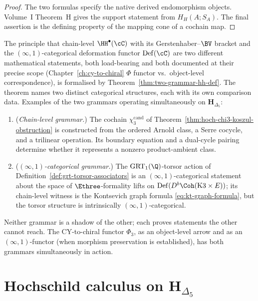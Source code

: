 \begin{proof}
The two formulas specify the native derived endomorphism objects.
Volume~I Theorem~H gives the support statement from $H_H(A;S_A)$.
The final assertion is the defining property of the mapping cone of a
cochain map.
\end{proof}

\begin{remark}
\label{rem:phi-functor-object-level-scope}
The principle that chain-level $\HH^\bullet(\cC)$ with its
Gerstenhaber--$\BV$ bracket and the $(\infty,1)$-categorical
deformation functor $\mathrm{Def}(\cC)$ are two different mathematical
statements, both load-bearing and both documented at their precise
scope (Chapter~\ref{ch:cy-to-chiral} $\Phi$ functor vs.\ object-level
correspondence), is formalised by Theorem~\ref{thm:two-grammar-hh-def}.
The theorem names two distinct categorical structures, each with its
own comparison data. Examples of the two grammars operating simultaneously on
$\mathbf H_{\Delta_5}$:
\begin{enumerate}[label=(\alph*),leftmargin=1.5em]
 \item (\emph{Chain-level grammar.}) The cochain
 $\chi_3^{\mathrm{cand}}$ of
 Theorem~\ref{thm:hoch-chi3-koszul-obstruction} is constructed from
 the ordered Arnold class, a Serre cocycle, and a trilinear operation.
 Its boundary equation and a dual-cycle pairing determine whether it
 represents a nonzero product-ambient class.
 \item (\emph{$(\infty,1)$-categorical grammar.}) The
 $\mathrm{GRT}_1(\Q)$-torsor action of
 Definition~\ref{def:grt-torsor-associators} is an
 $(\infty,1)$-categorical statement about the space of
 $\Ethree$-formality lifts on $\mathrm{Def}(D^b\Coh(\mathrm K3\times E))$;
 its chain-level witness is the Kontsevich graph formula
 \eqref{eq:kt-graph-formula}, but the torsor structure is intrinsically
 $(\infty,1)$-categorical.
\end{enumerate}
Neither grammar is a shadow of the other; each proves statements the
other cannot reach. The CY-to-chiral functor $\Phi_3$, as an
object-level arrow and as an $(\infty,1)$-functor (when morphism
preservation is established), has both grammars simultaneously in
action.
\end{remark}


\section{Hochschild calculus on \texorpdfstring{$\mathbf H_{\Delta_5}$}{H-Delta-5}}
\label{sec:hochcalc-hdelta5}

